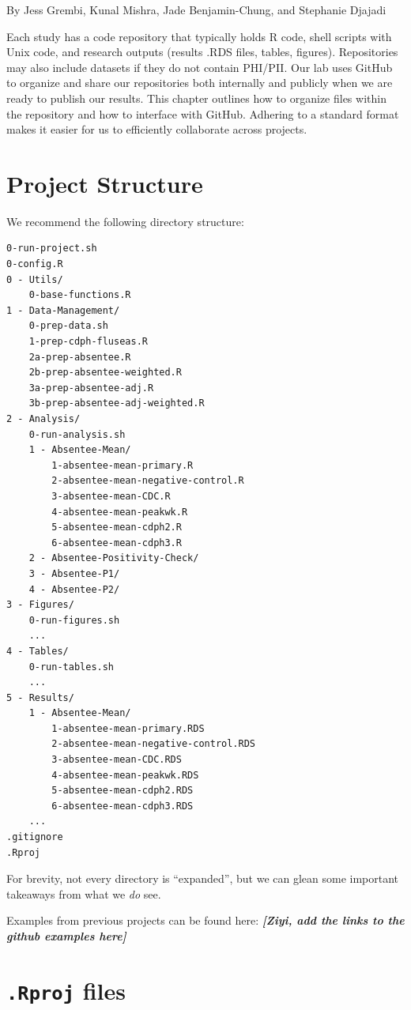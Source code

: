 \documentclass[
]{book}
\begin{document}
By Jess Grembi, Kunal Mishra, Jade Benjamin-Chung, and Stephanie Djajadi

Each study has a code repository that typically holds R code, shell scripts with Unix code, and research outputs (results .RDS files, tables, figures). Repositories may also include datasets if they do not contain PHI/PII. Our lab uses GitHub to organize and share our repositories both internally and publicly when we are ready to publish our results.
This chapter outlines how to organize files within the repository and how to interface with GitHub. Adhering to a standard format makes it easier for us to efficiently collaborate across projects.

\section{Project Structure}\label{project-structure}

We recommend the following directory structure:

\begin{verbatim}
0-run-project.sh
0-config.R
0 - Utils/
    0-base-functions.R
1 - Data-Management/
    0-prep-data.sh
    1-prep-cdph-fluseas.R
    2a-prep-absentee.R
    2b-prep-absentee-weighted.R
    3a-prep-absentee-adj.R
    3b-prep-absentee-adj-weighted.R
2 - Analysis/
    0-run-analysis.sh
    1 - Absentee-Mean/
        1-absentee-mean-primary.R
        2-absentee-mean-negative-control.R
        3-absentee-mean-CDC.R
        4-absentee-mean-peakwk.R
        5-absentee-mean-cdph2.R
        6-absentee-mean-cdph3.R
    2 - Absentee-Positivity-Check/
    3 - Absentee-P1/
    4 - Absentee-P2/
3 - Figures/
    0-run-figures.sh
    ...
4 - Tables/
    0-run-tables.sh
    ...
5 - Results/
    1 - Absentee-Mean/
        1-absentee-mean-primary.RDS
        2-absentee-mean-negative-control.RDS
        3-absentee-mean-CDC.RDS
        4-absentee-mean-peakwk.RDS
        5-absentee-mean-cdph2.RDS
        6-absentee-mean-cdph3.RDS
    ...
.gitignore
.Rproj
\end{verbatim}

For brevity, not every directory is ``expanded'', but we can glean some important takeaways from what we \emph{do} see.

Examples from previous projects can be found here:
\textbf{\emph{{[}Ziyi, add the links to the github examples here{]}}}

\section{\texorpdfstring{\texttt{.Rproj} files}{.Rproj files}}\label{rproj-files}
\end{document}
